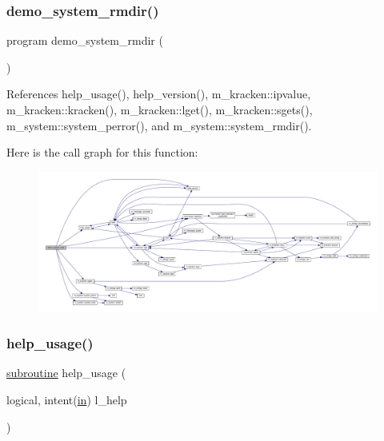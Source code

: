 \subsubsection{\texorpdfstring{demo\+\_\+system\+\_\+rmdir()}{demo\_system\_rmdir()}}
{\footnotesize\ttfamily program demo\+\_\+system\+\_\+rmdir (\begin{DoxyParamCaption}{ }\end{DoxyParamCaption})}



References help\+\_\+usage(), help\+\_\+version(), m\+\_\+kracken\+::ipvalue, m\+\_\+kracken\+::kracken(), m\+\_\+kracken\+::lget(), m\+\_\+kracken\+::sgets(), m\+\_\+system\+::system\+\_\+perror(), and m\+\_\+system\+::system\+\_\+rmdir().

Here is the call graph for this function\+:
\nopagebreak
\begin{figure}[H]
\begin{center}
\leavevmode
\includegraphics[width=350pt]{__rmdir_8f90_a1002470a8ce0812244a0c83197f3a97d_cgraph}
\end{center}
\end{figure}
\mbox{\label{__rmdir_8f90_a3e09a3b52ee8fb04eeb93fe5761626a8}} 
\subsubsection{\texorpdfstring{help\+\_\+usage()}{help\_usage()}}
{\footnotesize\ttfamily \hyperlink{M__stopwatch_83_8txt_acfbcff50169d691ff02d4a123ed70482}{subroutine} help\+\_\+usage (\begin{DoxyParamCaption}\item[{logical, intent(\hyperlink{M__journal_83_8txt_afce72651d1eed785a2132bee863b2f38}{in})}]{l\+\_\+help }\end{DoxyParamCaption})}



